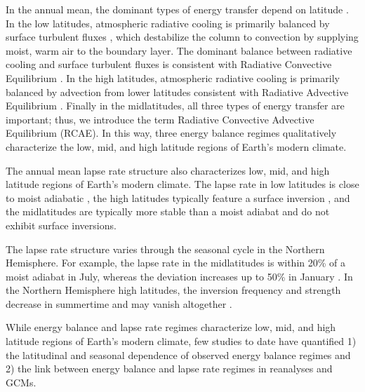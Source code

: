 \documentclass{ametsocV5}
\begin{document}
In the annual mean, the dominant types of energy transfer depend on latitude \citep[e.g., see Fig.~6.1 in][]{hartmann2016}. In the low latitudes, atmospheric radiative cooling is primarily balanced by surface turbulent fluxes \citep{riehl1958}, which destabilize the column to convection by supplying moist, warm air to the boundary layer. The dominant balance between radiative cooling and surface turbulent fluxes is consistent with Radiative Convective Equilibrium \citep[RCE,][]{wing2018}. In the high latitudes, atmospheric radiative cooling is primarily balanced by advection from lower latitudes \citep{nakamura1988} consistent with Radiative Advective Equilibrium \citep[RAE,][]{cronin2016}. Finally in the midlatitudes, all three types of energy transfer are important; thus, we introduce the term Radiative Convective Advective Equilibrium (RCAE). In this way, three energy balance regimes qualitatively characterize the low, mid, and high latitude regions of Earth's modern climate.

The annual mean lapse rate structure also characterizes low, mid, and high latitude regions of Earth's modern climate. The lapse rate in low latitudes is close to moist adiabatic \citep{stone1979,betts1982,xu1989,williams1993}, the high latitudes typically feature a surface inversion \citep[e.g., see Fig.~1.3 in][]{hartmann2016}, and the midlatitudes are typically more stable than a moist adiabat \citep{stone1979,korty2007} and do not exhibit surface inversions.

The lapse rate structure varies through the seasonal cycle in the Northern Hemisphere. For example, the lapse rate in the midlatitudes is within 20\% of a moist adiabat in July, whereas the deviation increases up to 50\% in January \citep{stone1979}. In the Northern Hemisphere high latitudes, the inversion frequency and strength decrease in summertime \citep{bradley1992, tjernstrom2009, devasthale2010, zhang2011, cronin2016} and may vanish altogether \citep{stone1979}.

While energy balance and lapse rate regimes characterize low, mid, and high latitude regions of Earth's modern climate, few studies to date have quantified 1) the latitudinal and seasonal dependence of observed energy balance regimes and 2) the link between energy balance and lapse rate regimes in reanalyses and GCMs.
\end{document}
